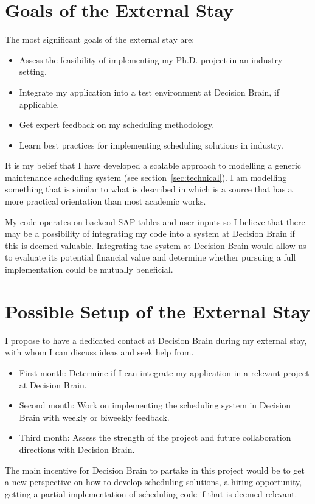 \section{Goals of the External Stay}
The most significant goals of the external stay are:

\begin{itemize}
	\item Assess the feasibility of implementing my Ph.D. project in an industry setting.
	\item Integrate my application into a test environment at Decision Brain, if applicable.
	\item Get expert feedback on my scheduling methodology. 
	\item Learn best practices for implementing scheduling solutions in industry.
\end{itemize}

It is my belief that I have developed a scalable approach to modelling a generic 
maintenance scheduling system (see section~\ref{sec:technical}). I am 
modelling something that is similar to what is described in \citep{palmerMaintenancePlanningScheduling2019} 
which is a source that has a more practical orientation than most academic works. 

My code operates on backend SAP tables and user inputs so I believe that there may be a possibility of integrating my 
code into a system at Decision Brain if this is deemed valuable. Integrating the system at Decision 
Brain would allow us to evaluate its potential financial value and determine whether pursuing a
full implementation could be mutually beneficial.

\newpage
\section{Possible Setup of the External Stay}
I propose to have a dedicated contact at Decision Brain during my external stay, with whom I can discuss ideas and seek help from.

\begin{itemize}
	\item First month: Determine if I can integrate my application in a relevant project at Decision Brain.
	\item Second month: Work on implementing the scheduling system in Decision Brain with weekly or biweekly feedback.
	\item Third month: Assess the strength of the project and future collaboration directions with Decision Brain.
\end{itemize}

The main incentive for Decision Brain to partake in this project would be to get a new perspective on how to develop scheduling solutions,
a hiring opportunity, getting a partial implementation of scheduling code if that is deemed relevant.

